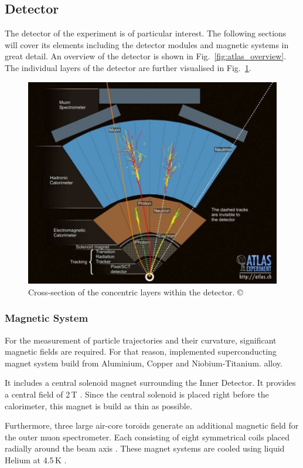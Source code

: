 \documentclass[bachelor,ngerman,english]{GAUBM}
\begin{document}
\subsection{Detector}
\label{sec:exp:atlas_detector}
The detector of the \atlas experiment is of particular interest. The following sections will cover its elements including the detector modules and magnetic systems in great detail. An overview of the detector is shown in Fig.~\ref{fig:atlas_overview}. The individual layers of the detector are further visualised in Fig.~\ref{fig:atlas_layers}. 

\begin{figure}[t]
    \centering
    \includegraphics[width=.61\textwidth]{figures/lhc/atlas_layers.png}
    \caption{Cross-section of the concentric layers within the \atlas detector. \copyright{\cern}}
    \label{fig:atlas_layers}
\end{figure}

\subsubsection*{Magnetic System}
For the measurement of particle trajectories and their curvature, significant magnetic fields are required. For that reason, \atlas implemented superconducting magnet system build from Aluminium, Copper and Niobium-Titanium. alloy. 

It includes a central solenoid magnet surrounding the Inner Detector. It provides a central field of 2\,T \cite{atlas:tech_design_report_01}. Since the central solenoid is placed right before the calorimeter, this magnet is build as thin as possible. 

Furthermore, three large air-core toroids generate an additional magnetic field for the outer muon spectrometer. Each consisting of eight symmetrical coils placed radially around the beam axis \cite{atlas:tech_design_report_01}. These magnet systems are cooled using liquid Helium at 4.5\,K \cite{atlas:tech_design_report_01}. 
\end{document}
